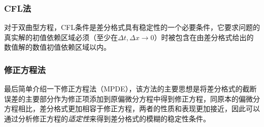 \documentclass[a4paper,10pt]{ctexart}
\begin{document}
\subsubsection{CFL法}
对于双曲型方程，CFL条件是差分格式具有稳定性的一个必要条件，它要求问题的真实解的初值依赖区域必须（至少在$ \Delta t,\Delta x\to 0 $）时被包含在由差分格式给出的数值解的数值初值依赖区域以内。

\subsubsection{修正方程法}
最后简单介绍一下修正方程法（MPDE），该方法的主要思想是将差分格式的截断误差的主要部分作为修正项添加到原偏微分方程中得到修正方程，同原本的偏微分方程相比，差分格式更加相容于修正方程，两者的性质和表现更加接近，因此可以通过分析修正方程的\emph{适定性}来得到差分格式的模糊的稳定性条件。
\end{document}
